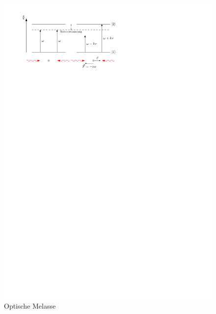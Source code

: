 \documentclass[11pt, a4paper]{article}
\numberwithin{equation}{section}
\begin{document}
\begin{figure}
	\centering
	\includegraphics{./figures/theory/melasse.pdf}
	\caption{Optische Melasse}
\end{figure}
\end{document}
